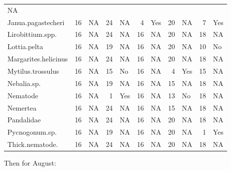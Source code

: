 \documentclass[]{article}
\begin{document}
\begin{longtable}[]{@{}lrlrlrlrlrl@{}}
NA\tabularnewline
Janua.pagastecheri & 16 & NA & 24 & NA & 4 & Yes & 20 & NA & 7 &
Yes\tabularnewline
Lirobittium.spp. & 16 & NA & 24 & NA & 16 & NA & 20 & NA & 18 &
NA\tabularnewline
Lottia.pelta & 16 & NA & 19 & NA & 16 & NA & 20 & NA & 10 &
No\tabularnewline
Margarites.helicinus & 16 & NA & 24 & NA & 16 & NA & 20 & NA & 18 &
NA\tabularnewline
Mytilus.trossulus & 16 & NA & 15 & No & 16 & NA & 4 & Yes & 15 &
NA\tabularnewline
Nebalia.sp. & 16 & NA & 19 & NA & 16 & NA & 15 & NA & 18 &
NA\tabularnewline
Nematode & 16 & NA & 1 & Yes & 16 & NA & 13 & No & 18 &
NA\tabularnewline
Nemertea & 16 & NA & 24 & NA & 16 & NA & 15 & NA & 18 &
NA\tabularnewline
Pandalidae & 16 & NA & 24 & NA & 16 & NA & 20 & NA & 18 &
NA\tabularnewline
Pycnogonum.sp. & 16 & NA & 19 & NA & 16 & NA & 20 & NA & 1 &
Yes\tabularnewline
Thick.nematode. & 16 & NA & 24 & NA & 16 & NA & 20 & NA & 18 &
NA\tabularnewline
\bottomrule
\end{longtable}

Then for August:
\end{document}
